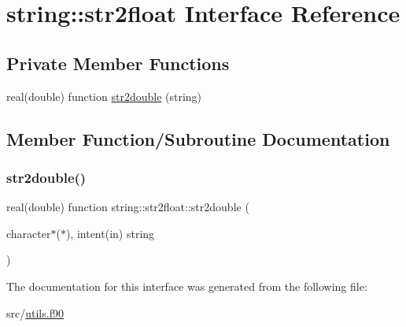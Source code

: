 \hypertarget{interfacestring_1_1str2float}{}\section{string\+:\+:str2float Interface Reference}
\label{interfacestring_1_1str2float}
\subsection*{Private Member Functions}
\begin{DoxyCompactItemize}
\item 
real(double) function \hyperlink{interfacestring_1_1str2float_a84b16dae3601bf2b4c3df6f272a3a5aa}{str2double} (string)
\end{DoxyCompactItemize}


\subsection{Member Function/\+Subroutine Documentation}
\mbox{\label{interfacestring_1_1str2float_a84b16dae3601bf2b4c3df6f272a3a5aa}} 
\subsubsection{\texorpdfstring{str2double()}{str2double()}}
{\footnotesize\ttfamily real(double) function string\+::str2float\+::str2double (\begin{DoxyParamCaption}\item[{character$\ast$($\ast$), intent(in)}]{string }\end{DoxyParamCaption})\hspace{0.3cm}{\ttfamily [private]}}



The documentation for this interface was generated from the following file\+:\begin{DoxyCompactItemize}
\item 
src/\hyperlink{utils_8f90}{utils.\+f90}\end{DoxyCompactItemize}
